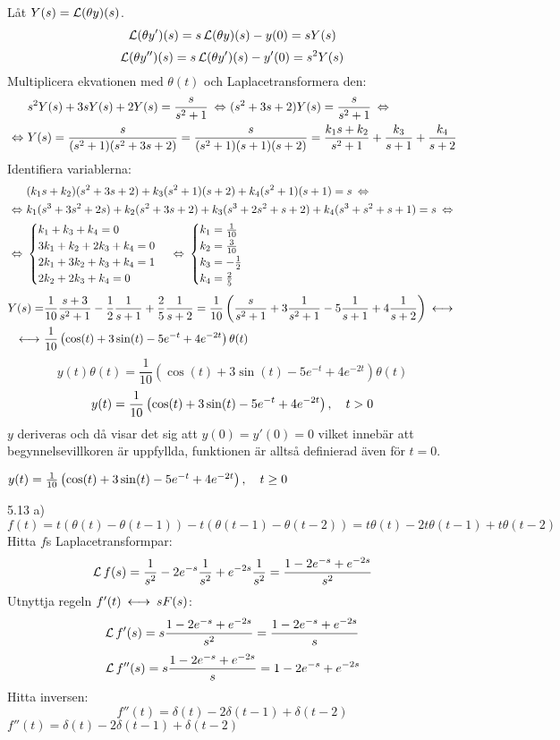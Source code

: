 \begin{task}{5.12}
	Låt $Y(s)=\operatorname{\mathcal{L}}(\theta y)(s)$.
	\[\operatorname{\mathcal{L}}(\theta y')(s)=s\operatorname{\mathcal{L}}(\theta y)(s)-y(0)=sY(s)\]
	\[\operatorname{\mathcal{L}}(\theta y'')(s)=s\operatorname{\mathcal{L}}(\theta y')(s)-y'(0)=s^2Y(s)\]
	Multiplicera ekvationen med $\theta(t)$ och Laplacetransformera den:
	\begin{align*}
	&s^2Y(s)+3sY(s)+2Y(s)=\frac{s}{s^2+1} \lra
	(s^2+3s+2)Y(s)=\frac{s}{s^2+1} \lra \\ \lra
	&Y(s)=\frac{s}{(s^2+1)(s^2+3s+2)}=
	\frac{s}{(s^2+1)(s+1)(s+2)}=
	\frac{k_1s+k_2}{s^2+1}+\frac{k_3}{s+1}+\frac{k_4}{s+2}
	\end{align*}
	Identifiera variablerna:
	\begin{align*}
	&(k_1s+k_2)(s^2+3s+2)+k_3(s^2+1)(s+2)+k_4(s^2+1)(s+1)=s \lra \\ \lra
	&k_1(s^3+3s^2+2s)+k_2(s^2+3s+2)+k_3(s^3+2s^2+s+2)+k_4(s^3+s^2+s+1)=s \lra \\ \lra
	&\begin{cases}
	k_1+k_3+k_4=0 \\
	3k_1+k_2+2k_3+k_4=0 \\
	2k_1+3k_2+k_3+k_4=1 \\
	2k_2+2k_3+k_4=0
	\end{cases} \lra
	\begin{cases}
	k_1=\frac{1}{10} \\
	k_2=\frac{3}{10} \\
	k_3=-\frac{1}{2} \\
	k_4=\frac{2}{5}
	\end{cases}
	\end{align*}
	\begin{align*}
	Y(s)=
	&\frac{1}{10}\*\frac{s+3}{s^2+1}-\frac{1}{2}\*\frac{1}{s+1}+\frac{2}{5}\*\frac{1}{s+2}=
	\frac{1}{10}\left(\frac{s}{s^2+1}+3\frac{1}{s^2+1}-5\frac{1}{s+1}+4\frac{1}{s+2}\right) \llra \\ \llra
	&\frac{1}{10}\left(\cos(t)+3\sin(t)-5e^{-t}+4e^{-2t}\right)\theta(t)
	\end{align*}
	\[y(t)\theta(t)=\frac{1}{10}\left(\cos(t)+3\sin(t)-5e^{-t}+4e^{-2t}\right)\theta(t)\]
	\[y(t)=\frac{1}{10}\left(\cos(t)+3\sin(t)-5e^{-t}+4e^{-2t}\right), \quad t>0\]
	$y$ deriveras och då visar det sig att $y(0)=y'(0)=0$ vilket innebär att begynnelsevillkoren är uppfyllda, funktionen är alltså definierad även för $t=0$.
	
	\ans $y(t)=\frac{1}{10}\left(\cos(t)+3\sin(t)-5e^{-t}+4e^{-2t}\right), \quad t\ge0$
\end{task}

\begin{task}{5.13 a)}
	\[f(t)=t(\theta(t)-\theta(t-1))-t(\theta(t-1)-\theta(t-2))=t\theta(t)-2t\theta(t-1)+t\theta(t-2)\]
	Hitta $f$s Laplacetransformpar:
	\[\operatorname{\mathcal{L}} f(s)=\frac{1}{s^2}-2e^{-s}\frac{1}{s^2}+e^{-2s}\frac{1}{s^2}=\frac{1-2e^{-s}+e^{-2s}}{s^2}\]
	Utnyttja regeln $f'(t)\llra sF(s)$:
	\[\operatorname{\mathcal{L}} f'(s)=s\frac{1-2e^{-s}+e^{-2s}}{s^2}=\frac{1-2e^{-s}+e^{-2s}}{s}\]
	\[\operatorname{\mathcal{L}} f''(s)=s\frac{1-2e^{-s}+e^{-2s}}{s}=1-2e^{-s}+e^{-2s}\]
	Hitta inversen:
	\[f''(t)=\delta(t)-2\delta(t-1)+\delta(t-2)\]
	\ans $f''(t)=\delta(t)-2\delta(t-1)+\delta(t-2)$
\end{task}